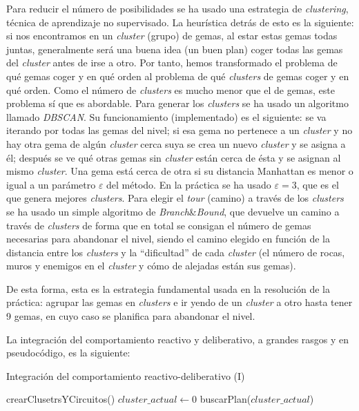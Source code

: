 \documentclass[11pt,a4paper]{article}
\begin{document}
Para reducir el número de posibilidades se ha usado una estrategia de \textit{clustering}, técnica de
aprendizaje no supervisado. La heurística detrás de esto es la siguiente: si nos encontramos en un
\textit{cluster} (grupo) de gemas, al estar estas gemas todas juntas, generalmente será una buena idea
(un buen plan) coger todas las gemas del \textit{cluster} antes de irse a otro. Por tanto, hemos
transformado el problema de qué gemas coger y en qué orden al problema de qué \textit{clusters} de
gemas coger y en qué orden. Como el número de \textit{clusters} es mucho menor que el de gemas, este
problema sí que es abordable. Para generar los \textit{clusters} se ha usado un algoritmo llamado
\textit{DBSCAN}. Su funcionamiento (implementado) es el siguiente: se va iterando por todas las gemas
del nivel; si esa gema no pertenece a un \textit{cluster} y no hay otra gema de algún \textit{cluster}
cerca suya se crea un nuevo \textit{cluster} y se asigna a él; después se ve qué otras gemas sin
\textit{cluster} están cerca de ésta y se asignan al mismo \textit{cluster}. Una gema está cerca de
otra si su distancia Manhattan es menor o igual a un parámetro $\varepsilon$ del método. En la
práctica se ha usado $\varepsilon = 3$, que es el que genera mejores \textit{clusters}. Para elegir el
\textit{tour} (camino) a través de los \textit{clusters} se ha usado un simple algoritmo de
\textit{Branch}\&\textit{Bound}, que devuelve un camino a través de \textit{clusters} de forma que en
total se consigan el número de gemas necesarias para abandonar el nivel, siendo el camino elegido en
función de la distancia entre los \textit{clusters} y la ``dificultad'' de cada \textit{cluster} (el
número de rocas, muros y enemigos en el \textit{cluster} y cómo de alejadas están sus gemas).

De esta forma, esta es la estrategia fundamental usada en la resolución de la práctica: agrupar las
gemas en \textit{clusters} e ir yendo de un \textit{cluster} a otro hasta tener 9 gemas, en cuyo caso
se planifica para abandonar el nivel.

La integración del comportamiento reactivo y deliberativo, a grandes rasgos y en pseudocódigo, es la
siguiente:

\begin{algorithm}
\caption{Integración del comportamiento reactivo-deliberativo (I)}
\begin{algorithmic}[1]
 
	\State crearClusetrsYCircuitos()
	\State $cluster\_actual \gets 0$
	\State buscarPlan($cluster\_actual$)
\end{algorithmic}
\end{algorithm}
\end{document}
